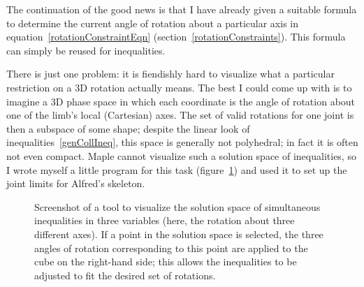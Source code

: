 The continuation of the good news is that I have already given a suitable formula to determine
the current angle of rotation about a particular axis in equation~\ref{rotationConstraintEqn}
(section~\ref{rotationConstraints}). This formula can simply be reused for inequalities.

There is just one problem: it is fiendishly hard to visualize what a particular restriction on
a 3D rotation actually means. The best I could come up with is to imagine a 3D phase space in
which each coordinate is the angle of rotation about one of the limb's local (Cartesian) axes.
The set of valid rotations for one joint is then a subspace of some shape; despite the linear
look of inequalities~\ref{genCollIneq}, this space is generally not polyhedral; in fact it is
often not even compact. Maple cannot visualize such a solution space of inequalities, so I wrote
myself a little program for this task (figure~\ref{jointLimit}) and used it to set up the joint
limits for Alfred's skeleton.

\begin{figure}
\centerline{}
\caption{Screenshot of a tool to visualize the solution space of simultaneous inequalities in
    three variables (here, the rotation about three different axes). If a point in the solution
    space is selected, the three angles of rotation corresponding to this point are applied to the
    cube on the right-hand side; this allows the inequalities to be adjusted to fit the desired
    set of rotations.\label{jointLimit}}
\end{figure}
